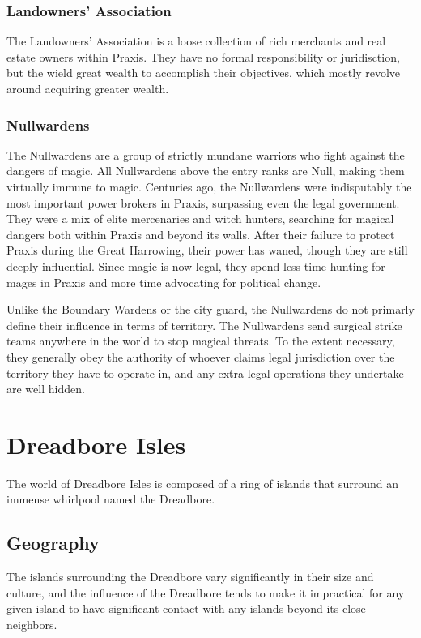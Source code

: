        \subsubsection{Landowners' Association}
            The Landowners' Association is a loose collection of rich merchants and real estate owners within Praxis.
            They have no formal responsibility or juridisction, but the wield great wealth to accomplish their objectives, which mostly revolve around acquiring greater wealth.

        \subsubsection{Nullwardens}
            The Nullwardens are a group of strictly mundane warriors who fight against the dangers of magic.
            All Nullwardens above the entry ranks are Null, making them virtually immune to magic.
            Centuries ago, the Nullwardens were indisputably the most important power brokers in Praxis, surpassing even the legal government.
            They were a mix of elite mercenaries and witch hunters, searching for magical dangers both within Praxis and beyond its walls.
            After their failure to protect Praxis during the Great Harrowing, their power has waned, though they are still deeply influential.
            Since magic is now legal, they spend less time hunting for mages in Praxis and more time advocating for political change.

            Unlike the Boundary Wardens or the city guard, the Nullwardens do not primarly define their influence in terms of territory.
            The Nullwardens send surgical strike teams anywhere in the world to stop magical threats.
            To the extent necessary, they generally obey the authority of whoever claims legal jurisdiction over the territory they have to operate in, and any extra-legal operations they undertake are well hidden.

\section{Dreadbore Isles}
    The world of Dreadbore Isles is composed of a ring of islands that surround an immense whirlpool named the Dreadbore.

    \subsection{Geography}
        The islands surrounding the Dreadbore vary significantly in their size and culture, and the influence of the Dreadbore tends to make it impractical for any given island to have significant contact with any islands beyond its close neighbors.

